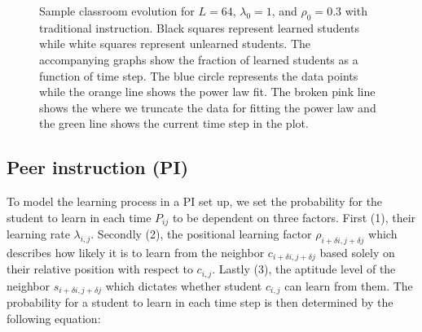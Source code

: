 \begin{figure}[htbp!]

    \caption[Example classroom evolution for the homogenous traditional instruction set up]{Sample classroom evolution for $L=64$, $\lambda_0 = 1$, and $\rho_0 = 0.3$ with traditional instruction. 
    Black squares represent learned students while white squares represent unlearned students. 
    The accompanying graphs show the fraction of learned students as a function of time step. 
    The blue circle represents the data points while the orange line shows the power law fit. 
    The broken pink line shows the where we truncate the data for fitting the power law and the green line shows the current time step in the plot.
    }
    \label{fig:2DBPCA traditional classroom evolution}
 \end{figure}

\subsection{Peer instruction (PI)}
To model the learning process in a PI set up, we set the probability for the student to learn in each time $P_{ij}$ to be dependent on three factors.
First (1), their learning rate $\lambda_{i,j}$. 
Secondly (2), the positional learning factor $\rho_{i+\delta i, j+\delta j}$ which describes how likely it is to learn from the neighbor $c_{i+\delta i, j+\delta j}$ based solely on their relative position with respect to $c_{i,j}$. 
Lastly (3), the aptitude level of the neighbor $s_{i+\delta i, j+\delta j}$ which dictates whether student $c_{i,j}$ can learn from them. 
The probability for a student to learn in each time step is then determined by the following equation:

